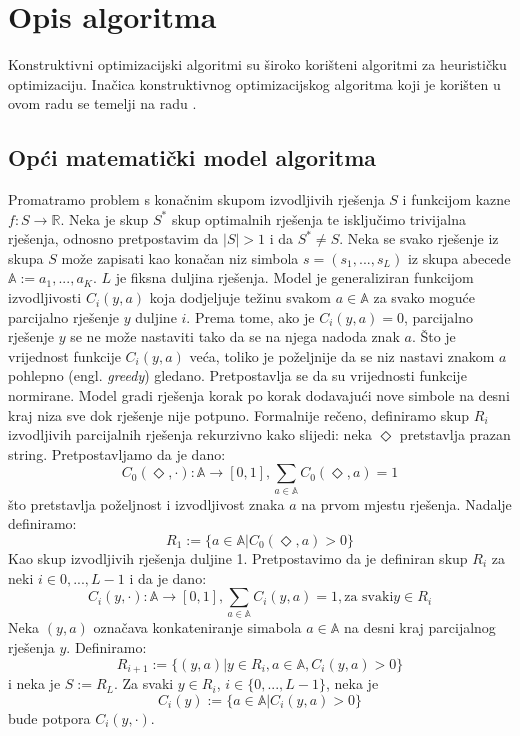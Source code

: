 \documentclass[times, utf8, zavrsni]{fer}
\begin{document}
\chapter{Opis algoritma}
Konstruktivni optimizacijski algoritmi su široko korišteni algoritmi za heurističku optimizaciju. Inačica konstruktivnog optimizacijskog algoritma koji je korišten u ovom radu se temelji na radu \citep{zijun2014asymptotic}.

\section{Opći matematički model algoritma}
Promatramo problem s konačnim skupom izvodljivih rješenja $S$ i funkcijom kazne $f: S \rightarrow \mathbb{R}$. Neka je skup $S^*$ skup optimalnih rješenja te isključimo trivijalna rješenja,
odnosno pretpostavim da $|S| > 1$ i da $S^* \neq S$. Neka se svako rješenje iz skupa $S$ može zapisati kao konačan niz simbola
$s = (s_1,...,s_L)$ iz skupa abecede $\mathbb{A} := {a_1,..., a_K}$. $L$ je fiksna duljina rješenja. Model je generaliziran funkcijom izvodljivosti $C_i(y, a)$ koja dodjeljuje težinu svakom $a \in \mathbb{A}$ za svako moguće parcijalno
rješenje $y$ duljine $i$. Prema tome, ako je $C_i(y, a) = 0$, parcijalno rješenje $y$ se ne može nastaviti tako da se na njega nadoda znak $a$. Što je vrijednost funkcije $C_i(y, a)$ veća, toliko je poželjnije da se niz nastavi znakom $a$ pohlepno (engl. \textit{greedy}) gledano. Pretpostavlja se da su vrijednosti funkcije normirane. Model gradi rješenja korak po korak dodavajući nove simbole na desni kraj niza sve dok rješenje nije potpuno. Formalnije rečeno, definiramo skup $R_i$ izvodljivih parcijalnih rješenja rekurzivno kako slijedi:
neka $\Diamond$ pretstavlja prazan string. Pretpostavljamo da je dano:
$$
C_0(\Diamond, \cdot) :\mathbb{A} \rightarrow [0, 1],   \sum_{a \in \mathbb{A}} C_0(\Diamond, a) = 1
$$
što pretstavlja poželjnost i izvodljivost znaka $a$ na prvom mjestu rješenja. Nadalje definiramo:
$$
R_1 := \{ a \in \mathbb{A} | C_0(\Diamond, a) > 0 \}
$$
Kao skup izvodljivih rješenja duljine 1. Pretpostavimo da je definiran skup $R_i$ za neki $i \in {0,..., L - 1}$ i da je dano:
$$
C_i(y, \cdot) :\mathbb{A} \rightarrow [0, 1], \sum_{a \in \mathbb{A}} C_i(y, a) = 1, \text{za svaki} y \in R_i
$$
Neka $(y, a)$ označava konkateniranje simabola $a \in \mathbb{A}$ na desni kraj parcijalnog rješenja $y$. Definiramo:
$$
R_{i+1} := \{ (y, a) | y \in R_i, a \in \mathbb{A}, C_i(y, a) > 0 \}
$$
i neka je $S := R_L$. Za svaki $y \in R_i$, $i \in \{0,..., L-1\}$, neka je
$$
C_i(y) := \{ a \in \mathbb{A} | C_i(y, a) > 0 \}
$$
bude potpora $C_i(y, \cdot)$. %
\end{document}

